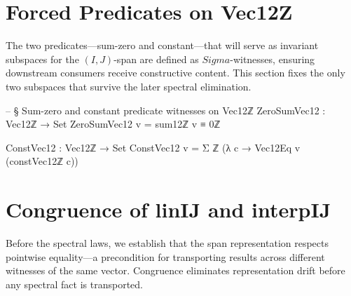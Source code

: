 \documentclass[11pt,a4paper]{book}
\def\Sigma{Sigma}%
\def\mathbb#1{#1}%
\def\texttt#1{#1}%
\def\text#1{#1}%
\def\texorpdfstring#1#2{#2}%
\begin{document}
\section{Forced Predicates on \texorpdfstring{$\text{Vec}_{12}\mathbb{Z}$}{Vec12Z}}

The two predicates---sum-zero and constant---that will serve
as invariant subspaces for the $(I,J)$-span are defined as
$\Sigma$-witnesses, ensuring downstream consumers receive
constructive content.  This section fixes the only two subspaces that survive
the later spectral elimination.

\begin{code}
-- § Sum-zero and constant predicate witnesses on Vec12ℤ
ZeroSumVec12 : Vec12ℤ → Set
ZeroSumVec12 v = sum12ℤ v ≡ 0ℤ

ConstVec12 : Vec12ℤ → Set
ConstVec12 v = Σ ℤ (λ c → Vec12Eq v (constVec12ℤ c))
\end{code}


\section{Congruence of \texorpdfstring{$\texttt{linIJ}$}{linIJ} and \texorpdfstring{$\texttt{interpIJ}$}{interpIJ}}

Before the spectral laws, we establish that the span representation
respects pointwise equality---a precondition for transporting
results across different witnesses of the same vector.  Congruence eliminates
representation drift before any spectral fact is transported.
\end{document}
